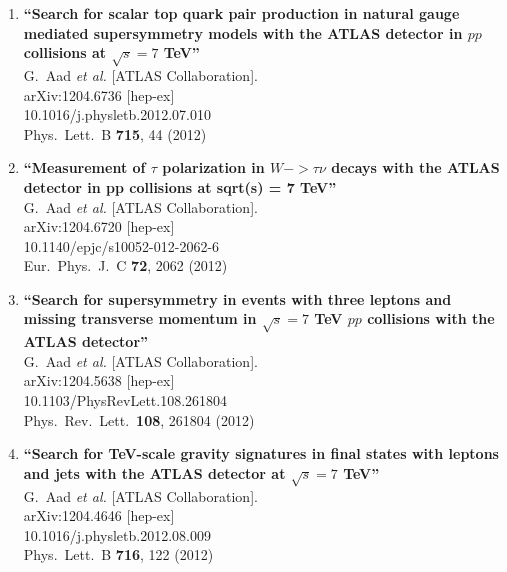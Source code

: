 \documentclass{article}
\begin{document}
\begin{enumerate}
\item%
{\bf ``Search for scalar top quark pair production in natural gauge mediated supersymmetry models with the ATLAS detector in $pp$ collisions at $\sqrt{s}=7$ TeV''}
  \\{}G.~Aad {\it et al.}  [ATLAS Collaboration].
  \\{}arXiv:1204.6736 [hep-ex]
    \\{}10.1016/j.physletb.2012.07.010
\\{}Phys.\ Lett.\ B {\bf 715}, 44 (2012) %


\item%
{\bf ``Measurement of $\tau$ polarization in $W -> \tau \nu$ decays with the ATLAS detector in pp collisions at sqrt(s) = 7 TeV''}
  \\{}G.~Aad {\it et al.}  [ATLAS Collaboration].
  \\{}arXiv:1204.6720 [hep-ex]
    \\{}10.1140/epjc/s10052-012-2062-6
\\{}Eur.\ Phys.\ J.\ C {\bf 72}, 2062 (2012) %


\item%
{\bf ``Search for supersymmetry in events with three leptons and missing transverse momentum in $\sqrt{s}=7$ TeV $pp$ collisions with the ATLAS detector''}
  \\{}G.~Aad {\it et al.}  [ATLAS Collaboration].
  \\{}arXiv:1204.5638 [hep-ex]
    \\{}10.1103/PhysRevLett.108.261804
\\{}Phys.\ Rev.\ Lett.\  {\bf 108}, 261804 (2012) %


\item%
{\bf ``Search for TeV-scale gravity signatures in final states with leptons and jets with the ATLAS detector at $\sqrt{s}=7$ TeV''}
  \\{}G.~Aad {\it et al.}  [ATLAS Collaboration].
  \\{}arXiv:1204.4646 [hep-ex]
    \\{}10.1016/j.physletb.2012.08.009
\\{}Phys.\ Lett.\ B {\bf 716}, 122 (2012) %



\end{enumerate}
\end{document}
